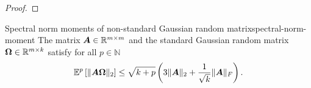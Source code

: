 \documentclass[12pt]{article}
\begin{document}
\begin{proof}

\end{proof}

\begin{lemma}{Spectral norm moments of non-standard Gaussian random matrix}{spectral-norm-moment}
    The matrix $\boldsymbol{A} \in \mathbb{R}^{m \times m}$ and the standard Gaussian random matrix $\boldsymbol{\Omega} \in \mathbb{R}^{m \times k}$ satisfy for all $p \in \mathbb{N}$ 
    \begin{equation}
        \mathbb{E}^{p}\left[ \lVert \boldsymbol{A} \boldsymbol{\Omega} \rVert _2 \right]
        \leq  \sqrt{k + p} \left( 3 \lVert \boldsymbol{A} \rVert _2 + \frac{1}{\sqrt{k}} \lVert \boldsymbol{A} \rVert _F \right).
    \end{equation}
\end{lemma}
\end{document}
